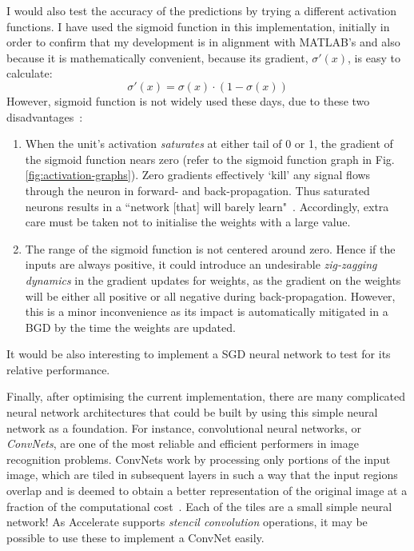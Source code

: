 I would also test the accuracy of the predictions by trying a different activation functions. I have used the sigmoid function in this implementation, initially in order to confirm that my development is in alignment with MATLAB's and also because it is mathematically convenient, because its gradient, $\sigma'(x)$, is easy to calculate:
$$\sigma'(x) = \sigma(x) \cdot (1 - \sigma(x))$$
However, sigmoid function is not widely used these days, due to these two disadvantages~\cite{Kar16}:
\begin{enumerate}
\item When the unit's activation \textit{saturates} at either tail of 0 or 1, the gradient of the sigmoid function nears zero (refer to the sigmoid function graph in Fig. \ref{fig:activation-graphs}). Zero gradients effectively `kill' any signal flows through the neuron in forward- and back-propagation. Thus saturated neurons results in a ``network [that] will barely learn"~\cite{Kar16}. Accordingly, extra care must be taken not to initialise the weights with a large value.
\item The range of the sigmoid function is not centered around zero. Hence if the inputs are always positive, it could introduce an undesirable \textit{zig-zagging dynamics} in the gradient updates for weights, as the gradient on the weights will be either all positive or all negative during back-propagation. However, this is a minor inconvenience as its impact is automatically mitigated in a BGD by the time the weights are updated.
\end{enumerate}

It would be also interesting to implement a SGD neural network to test for its relative performance.

Finally, after optimising the current implementation, there are many complicated neural network architectures that could be built by using this simple neural network as a foundation. For instance, convolutional neural networks, or \textit{ConvNets}, are one of the most reliable and efficient performers in image recognition problems. ConvNets work by processing only portions of the input image, which are tiled in subsequent layers in such a way that the input regions overlap and is deemed to obtain a better representation of the original image at a fraction of the computational cost~\cite{Kar16}. Each of the tiles are a small simple neural network! As Accelerate supports \emph{stencil convolution} operations, it may be possible to use these to implement a ConvNet easily.

